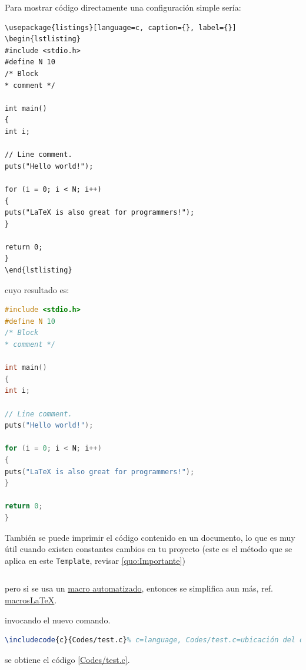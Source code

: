 Para mostrar código directamente una configuración simple sería:
\begin{verbatim}
\usepackage{listings}[language=c, caption={}, label={}]
\begin{lstlisting}
#include <stdio.h>
#define N 10
/* Block
* comment */

int main()
{
int i;

// Line comment.
puts("Hello world!");

for (i = 0; i < N; i++)
{
puts("LaTeX is also great for programmers!");
}

return 0;
}
\end{lstlisting}
\end{verbatim}

cuyo resultado es:
\begin{lstlisting}[language=c, caption={}, label={}]
#include <stdio.h>
#define N 10
/* Block
* comment */

int main()
{
int i;

// Line comment.
puts("Hello world!");

for (i = 0; i < N; i++)
{
puts("LaTeX is also great for programmers!");
}

return 0;
}
\end{lstlisting}

También se puede imprimir el código contenido en un documento, lo que es muy útil cuando existen constantes cambios en tu proyecto (este es el método que se aplica en este \verb|Template|, revisar \ref{quo:Importante})
\begin{lstlisting}[language=tex, caption={}, label={}]

\end{lstlisting}

pero si se usa un \href{http://en.wikibooks.org/wiki/LaTeX/Source_Code_Listings#Automating_file_inclusion}{macro automatizado}, entonces se simplifica aun más, ref. \href{ http://en.wikibooks.org/wiki/LaTeX/Macros#New_commands}{macros{\LaTeX}}. 


invocando el nuevo comando.
\begin{lstlisting}[language=tex, caption={}, label={}]
\includecode{c}{Codes/test.c}% c=language, Codes/test.c=ubicación del documento
\end{lstlisting}

se obtiene el código \ref{Codes/test.c}.

